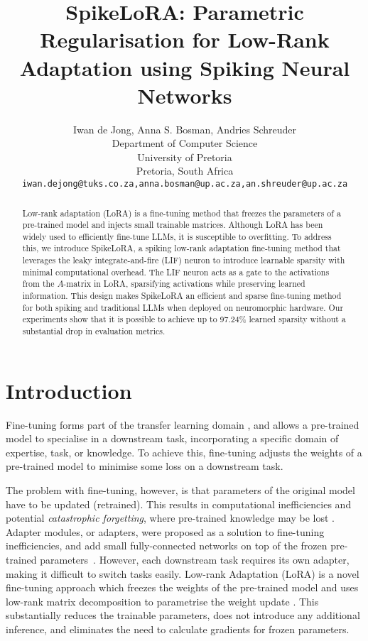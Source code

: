\documentclass{article} %
\title{SpikeLoRA: Parametric Regularisation for Low-Rank Adaptation using Spiking Neural Networks}
\author{Iwan de Jong, Anna S. Bosman, Andries Schreuder \\
Department of Computer Science\\
University of Pretoria\\
Pretoria, South Africa \\
\texttt{iwan.dejong@tuks.co.za,anna.bosman@up.ac.za,an.shreuder@up.ac.za} \\
}
\begin{document}
\maketitle

\begin{abstract}
Low-rank adaptation (LoRA) is a fine-tuning method that freezes the parameters of a pre-trained model and injects small trainable matrices. Although LoRA has been widely used to efficiently fine-tune LLMs, it is susceptible to overfitting. To address this, we introduce SpikeLoRA, a spiking low-rank adaptation fine-tuning method that leverages the leaky integrate-and-fire (LIF) neuron to introduce learnable sparsity with minimal computational overhead. The LIF neuron acts as a gate to the activations from the \(A\)-matrix in LoRA, sparsifying activations while preserving learned information. This design makes SpikeLoRA an efficient and sparse fine-tuning method for both spiking and traditional LLMs when deployed on neuromorphic hardware. Our experiments show that it is possible to achieve up to 97.24\% learned sparsity without a substantial drop in evaluation metrics. 
\end{abstract}

\section{Introduction}
Fine-tuning forms part of the transfer learning domain \citep{raffel_exploring_2020}, and allows a pre-trained model to specialise in a downstream task, incorporating a specific domain of expertise, task, or knowledge. To achieve this, fine-tuning adjusts the weights of a pre-trained model to minimise some loss on a downstream task.%

The problem with fine-tuning, however, is that parameters of the original model have to be updated (retrained). This results in computational inefficiencies and potential \emph{catastrophic forgetting}, where pre-trained knowledge may be lost \citep{song_how_2025}. Adapter modules, or adapters, were proposed as a solution to fine-tuning inefficiencies, and add small fully-connected networks on top of the frozen pre-trained parameters~\citep{houlsby_parameter-efficient_2019-1}. However, each downstream task requires its own adapter, making it difficult to switch tasks easily. Low-rank Adaptation (LoRA) is a novel fine-tuning approach which freezes the weights of the pre-trained model and uses low-rank matrix decomposition to parametrise the weight update \citep{hu_lora_2022}. This substantially reduces the trainable parameters, does not introduce any additional inference, and eliminates the need to calculate gradients for frozen parameters.
\end{document}
